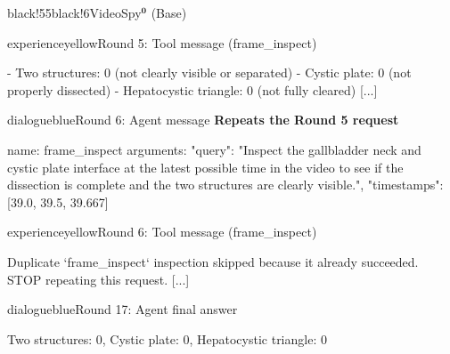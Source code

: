 \begin{ExecutionBox}{black!55}{black!6}{VideoSpy$^{\mathbf{0}}$ (Base)}
\raggedright
\begin{MessageBox}{experienceyellow}{Round 5: Tool message (frame\_inspect)}
\begin{Trajectory}
[...] - Two structures: 0 (not clearly visible or separated)
- Cystic plate: 0 (not properly dissected)
- Hepatocystic triangle: 0 (not fully cleared) [...]
\end{Trajectory}
\end{MessageBox}
\begin{MessageBox}[agent message,frame hidden,borderline={1pt}{0pt}{changeaccent,dash pattern=on 3pt off 2pt},colbacktitle=red!4]{dialogueblue}{Round 6: Agent message}
\noindent\textcolor{changeaccent}{\textbf{Repeats the Round 5 request}}\par
\begin{Trajectory}
name: frame_inspect  arguments: {"query": "Inspect the gallbladder neck and cystic plate interface at the latest possible time in the video to see if the dissection is complete and the two structures are clearly visible.", "timestamps": [39.0, 39.5, 39.667]}
\end{Trajectory}
\end{MessageBox}
\begin{MessageBox}{experienceyellow}{Round 6: Tool message (frame\_inspect)}
\begin{Trajectory}
[...] Duplicate `frame_inspect` inspection skipped because it already succeeded. STOP repeating this request. [...]
\end{Trajectory}
\end{MessageBox}
\begin{MessageBox}{dialogueblue}{Round 17: Agent final answer}
\begin{Trajectory}
Two structures: 0, Cystic plate: 0, Hepatocystic triangle: 0
\end{Trajectory}
\end{MessageBox}
\end{ExecutionBox}
